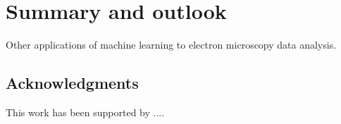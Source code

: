 \section{Summary and outlook}
\label{sec:summary}

Other applications of machine learning to
electron microscopy data analysis.


\subsection*{Acknowledgments}
This work has been supported by ....
